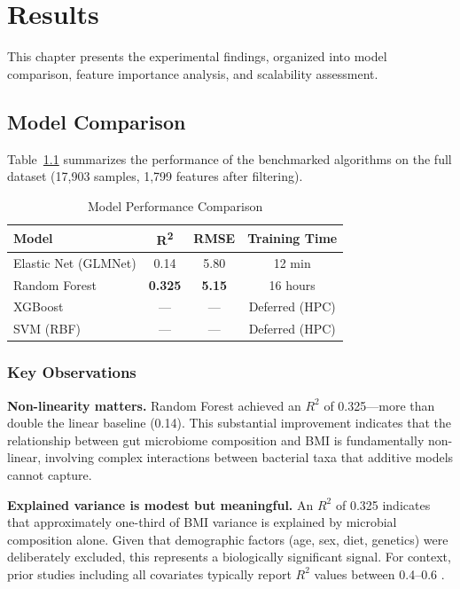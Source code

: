
\chapter{Results}
\label{ch:results}

This chapter presents the experimental findings, organized into model comparison, feature importance analysis, and scalability assessment.

\section{Model Comparison}

Table~\ref{tab:model_comparison} summarizes the performance of the benchmarked algorithms on the full dataset (17,903 samples, 1,799 features after filtering).

\begin{table}[h]
\centering
\caption{Model Performance Comparison}
\label{tab:model_comparison}
\begin{tabular}{lccc}
\hline
\textbf{Model} & \textbf{R\textsuperscript{2}} & \textbf{RMSE} & \textbf{Training Time} \\
\hline
Elastic Net (GLMNet) & 0.14 & 5.80 & 12 min \\
Random Forest & \textbf{0.325} & \textbf{5.15} & 16 hours \\
XGBoost & --- & --- & Deferred (HPC) \\
SVM (RBF) & --- & --- & Deferred (HPC) \\
\hline
\end{tabular}
\end{table}

\subsection{Key Observations}

\textbf{Non-linearity matters.} Random Forest achieved an $R^2$ of 0.325---more than double the linear baseline (0.14). This substantial improvement indicates that the relationship between gut microbiome composition and BMI is fundamentally non-linear, involving complex interactions between bacterial taxa that additive models cannot capture.

\textbf{Explained variance is modest but meaningful.} An $R^2$ of 0.325 indicates that approximately one-third of BMI variance is explained by microbial composition alone. Given that demographic factors (age, sex, diet, genetics) were deliberately excluded, this represents a biologically significant signal. For context, prior studies including all covariates typically report $R^2$ values between 0.4--0.6 \cite{NIHMBMI2024}.

